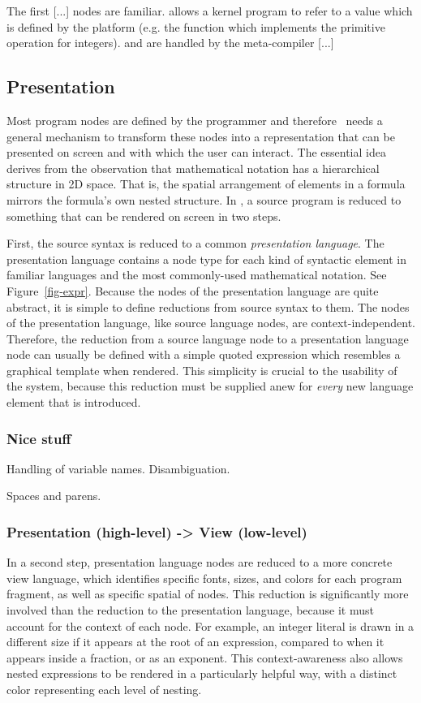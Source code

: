 The first [...] nodes are familiar.  allows a kernel program to refer to a value which is defined by the platform (e.g. the function which implements the primitive \cl{+} operation for integers).  and  are handled by the meta-compiler [...]


\subsection{Presentation}

Most program nodes are defined by the programmer and therefore \Meta\ needs a general mechanism to transform these nodes into a representation that can be presented on screen and with which the user can interact. The essential idea derives from the observation that mathematical notation has a hierarchical structure in 2D space. That is, the spatial arrangement of elements in a formula mirrors the formula's own nested structure. In \Meta, a source program is reduced to something that can be rendered on screen in two steps. 

First, the source syntax is reduced to a common \emph{presentation language}. The presentation language contains a node type for each kind of syntactic element in familiar languages and the most commonly-used mathematical notation. See Figure~\ref{fig-expr}. Because the nodes of the presentation language are quite abstract, it is simple to define reductions from source syntax to them. The nodes of the presentation language, like source language nodes, are context-independent. Therefore, the reduction from a source language node to a presentation language node can usually be defined with a simple quoted expression which resembles a graphical template when rendered. This simplicity is crucial to the usability of the system, because this reduction must be supplied anew for \emph{every} new language element that is introduced.

\subsubsection{Nice stuff}
Handling of variable names. Disambiguation.

Spaces and parens.

\subsubsection{Presentation (high-level) -> View (low-level)}
In a second step, presentation language nodes are reduced to a more concrete {view language}, which identifies specific fonts, sizes, and colors for each program fragment, as well as specific spatial of nodes. This reduction is significantly more involved than the reduction to the presentation language, because it must account for the context of each node. For example, an integer literal is drawn in a different size if it appears at the root of an expression, compared to when it appears inside a fraction, or as an exponent. This context-awareness also allows nested expressions to be rendered in a particularly helpful way, with a distinct color representing each level of nesting.

